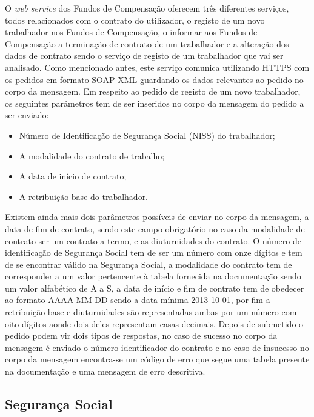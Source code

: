 \documentclass[sigplan]{acmart}
\begin{document}
O \textit{web service} dos Fundos de Compensação oferecem três diferentes serviços, todos relacionados com o contrato do utilizador, o registo de um novo trabalhador nos Fundos de Compensação, o informar aos Fundos de Compensação a terminação de contrato de um trabalhador e a alteração dos dados de contrato sendo o serviço de registo de um trabalhador que vai ser analisado. Como mencionado antes, este serviço comunica utilizando HTTPS com os pedidos em formato SOAP XML guardando os dados relevantes ao pedido no corpo da mensagem. Em respeito ao pedido de registo de um novo trabalhador, os seguintes parâmetros tem de ser inseridos no corpo da mensagem do pedido a ser enviado:
\begin{itemize}
  \item Número de Identificação de Segurança Social (NISS) do trabalhador;
  \item A modalidade do contrato de trabalho;
  \item A data de início de contrato;
  \item A retribuição base do trabalhador.
\end{itemize}
Existem ainda mais dois parâmetros possíveis de enviar no corpo da mensagem, a data de fim de contrato, sendo este campo obrigatório no caso da modalidade de contrato ser um contrato a termo, e as diuturnidades do contrato. O número de identificação de Segurança Social tem de ser um número com onze dígitos e tem de se encontrar válido na Segurança Social, a modalidade do contrato tem de corresponder a um valor pertencente à tabela fornecida na documentação sendo um valor alfabético de A a S, a data de início e fim de contrato tem de obedecer ao formato AAAA-MM-DD sendo a data mínima 2013-10-01, por fim a retribuição base e diuturnidades são representadas ambas por um número com oito dígitos aonde dois deles representam casas decimais. Depois de submetido o pedido podem vir dois tipos de respostas, no caso de sucesso no corpo da mensagem é enviado o número identificador do contrato e no caso de insucesso no corpo da mensagem encontra-se um código de erro que segue uma tabela presente na documentação e uma mensagem de erro descritiva.

\subsection{Segurança Social}
\end{document}
